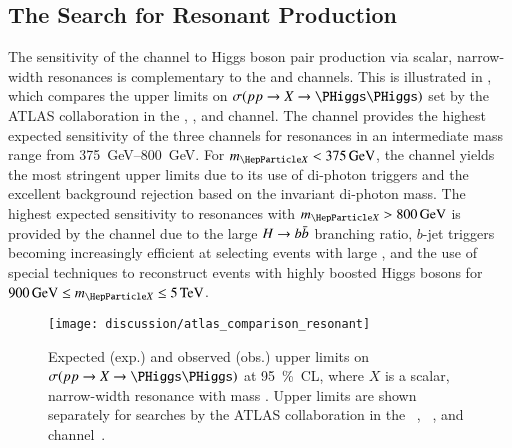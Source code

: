 

\subsection{The Search for Resonant \HH Production}

The sensitivity of the \bbtautau channel to Higgs boson pair production via
scalar, narrow-width resonances is complementary to the \bbyy and \bbbb
channels. This is illustrated in , which compares
the upper limits on $\sigma(\pp \to X \to \HH)$ set by the ATLAS collaboration
in the \bbbb, \bbyy, and \bbtautau channel. The \bbtautau channel provides the
highest expected sensitivity of the three channels for resonances in an
intermediate mass range from \SIrange{375}{800}{\GeV}. For
$\mX < \SI{375}{\GeV}$, the \bbyy channel yields the most stringent upper limits
due to its use of di-photon triggers and the excellent background rejection
based on the invariant di-photon mass.
The highest expected sensitivity to resonances with $\mX > \SI{800}{\GeV}$ is
provided by the \bbbb channel due to the large $H \to b\bar{b}$ branching ratio,
$b$-jet triggers becoming increasingly efficient at selecting events with large
\mHH, and the use of special techniques to reconstruct events with highly
boosted Higgs bosons for $\SI{900}{\GeV} \leq \mX \leq \SI{5}{\TeV}$.

\begin{figure}[htbp]
  \centering

  \texttt{[image: discussion/atlas\_comparison\_resonant]}

  \caption[Expected and observed upper limits on $\sigma(\pp \to X \to \HH)$ at
  \SI{95}{\percent}~CL]{Expected (exp.) and observed (obs.) upper limits on
    $\sigma(\pp \to X \to \HH)$ at \SI{95}{\percent}~CL, where $X$ is a scalar,
    narrow-width resonance with mass \mX. Upper limits are shown separately for
    searches by the ATLAS collaboration in the
    \bbbb~\cite{HDBS-2018-41,hepdata.111124},
    \bbyy~\cite{HDBS-2018-34,hepdata.105864}, and \bbtautau
    channel~\cite{HDBS-2018-40}.}%
  \label{fig:resonant_hh_limits}
\end{figure}

